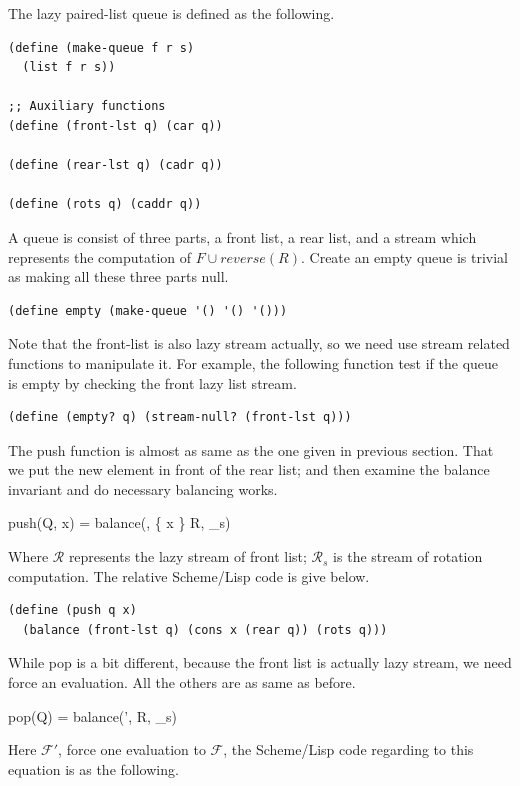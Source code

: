 \documentclass{article}
\begin{document}
The lazy paired-list queue is defined as the following.

\lstset{language=Lisp}
\begin{lstlisting}
(define (make-queue f r s)
  (list f r s))

;; Auxiliary functions
(define (front-lst q) (car q))

(define (rear-lst q) (cadr q))

(define (rots q) (caddr q))
\end{lstlisting}

A queue is consist of three parts, a front list, a rear list,
and a stream which represents the computation of $F \cup reverse(R)$.
Create an empty queue is trivial as making all these three parts
null.

\begin{lstlisting}
(define empty (make-queue '() '() '()))
\end{lstlisting}

Note that the front-list is also lazy stream actually, so we need use
stream related functions to manipulate it. For example, the following
function test if the queue is empty by checking the front lazy list stream.

\begin{lstlisting}
(define (empty? q) (stream-null? (front-lst q)))
\end{lstlisting}

The push function is almost as same as the one given in previous section.
That we put the new element in front of the rear list; and then examine
the balance invariant and do necessary balancing works.

\be
push(Q, x) = balance(, \{ x \} \cup R, _s)
\ee

Where $\mathcal{R}$ represents the lazy stream of front list; $\mathcal{R}_s$ is
the stream of rotation computation. The relative Scheme/Lisp
code is give below.

\begin{lstlisting}
(define (push q x)
  (balance (front-lst q) (cons x (rear q)) (rots q)))
\end{lstlisting}

While pop is a bit different, because the front list is actually lazy stream,
we need force an evaluation. All the others are as same as before.

\be
pop(Q) = balance(', R, _s)
\ee

Here $\mathcal{F}'$, force one evaluation to $\mathcal{F}$, the Scheme/Lisp
code regarding to this equation is as the following.
\end{document}
